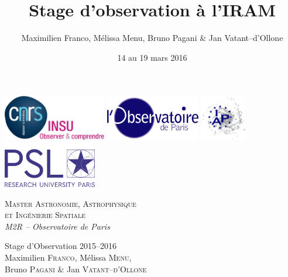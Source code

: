\documentclass[a4paper,10pt,french]{article}
\title{Stage d’observation à l’IRAM}
\author{Maximilien Franco, Mélissa Menu, Bruno Pagani \& Jan Vatant--d’Ollone}
\date{14 au 19 mars 2016}
\begin{document}

\setlength{\parindent}{0pt}

\thispagestyle{empty}

\includegraphics[height=2cm]{logo_insu.jpg} \hfill
\includegraphics[height=2cm]{logo_obspm.jpg} \hfill
\includegraphics[height=2cm]{logo_iap.jpg} \hfill
\includegraphics[height=2cm]{logo_psl.png}

\vspace{0.5cm}

\noindent
\begin{minipage}{.5\textwidth}
    \textsc{Master Astronomie, Astrophysique} \\
    \textsc{et Ingénierie Spatiale} \\
    \textit{M2R – Observatoire de Paris}
\end{minipage}%
\begin{minipage}{.5\textwidth}
    \begin{flushright}
        Stage d’Observation 2015--2016 \\
        Maximilien \textsc{Franco}, Mélissa \textsc{Menu}, \\
        Bruno \textsc{Pagani} \& Jan \textsc{Vatant--d’Ollone}
    \end{flushright}
\end{minipage}
\end{document}
